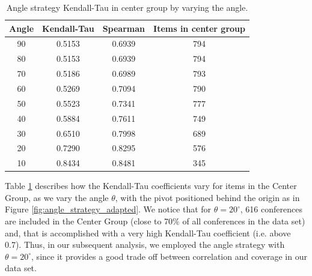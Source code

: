 \documentclass[notitlepage]{svjour3}
\begin{document}
\begin{table}[h!]
\centering
 \begin{tabular}{c c c c} 
 \toprule
 Angle & Kendall-Tau & Spearman & Items in center group \\ 
 \midrule
 90 & 0.5153 & 0.6939 & 794 \\ 
 80 & 0.5153 & 0.6939 & 794 \\
 70 & 0.5186 & 0.6989 & 793 \\
 60 & 0.5269 & 0.7094 & 790 \\
 50 & 0.5523 & 0.7341 & 777 \\
 40 & 0.5884 & 0.7611 & 749 \\
 30 & 0.6510 & 0.7998 & 689 \\
 20 & 0.7290 & 0.8295 & 576 \\
 10 & 0.8434 & 0.8481 & 345 \\
 \bottomrule
 \end{tabular}
 \caption{Angle strategy Kendall-Tau in center group by varying the angle.}
 \label{tab:angle_strategy}
\end{table}

Table \ref{tab:angle_strategy} describes how the Kendall-Tau coefficients vary for items 
in the Center Group, as we vary the angle $ \theta $, with the pivot positioned behind 
the origin as in Figure \ref{fig:angle_strategy_adapted}. We notice that for $ \theta = 20^{\circ} $, 
616 conferences are included in the Center
Group (close to 70\% of all conferences in the data set) and, that is accomplished with a very high Kendall-Tau 
coefficient (i.e. above 0.7). Thus, in our subsequent 
analysis, we employed the angle strategy with $ \theta = 20^{\circ} $, since it provides 
a good trade off between correlation and coverage in our data set.
\end{document}
